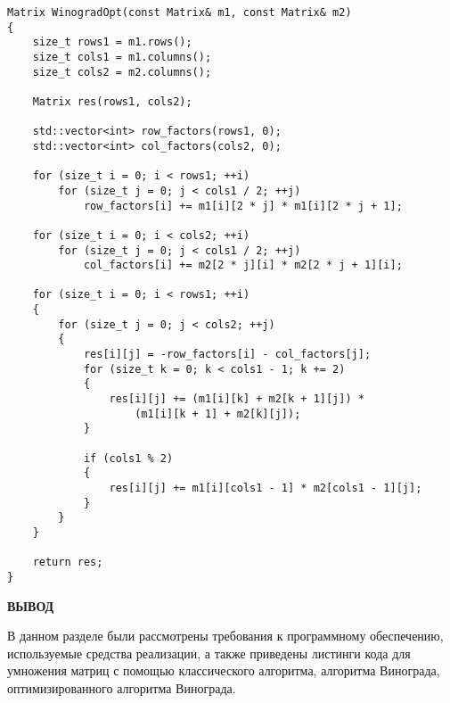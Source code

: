 \begin{center}
\captionsetup{justification=raggedright,singlelinecheck=off}
\begin{lstlisting}[label=lst:dam_lev_dyn,caption=Оптимизированный алгоритм Винограда]
Matrix WinogradOpt(const Matrix& m1, const Matrix& m2)
{
    size_t rows1 = m1.rows();
    size_t cols1 = m1.columns();
    size_t cols2 = m2.columns();

    Matrix res(rows1, cols2);

    std::vector<int> row_factors(rows1, 0);
    std::vector<int> col_factors(cols2, 0);

    for (size_t i = 0; i < rows1; ++i)
        for (size_t j = 0; j < cols1 / 2; ++j)
            row_factors[i] += m1[i][2 * j] * m1[i][2 * j + 1];

    for (size_t i = 0; i < cols2; ++i)
        for (size_t j = 0; j < cols1 / 2; ++j)
            col_factors[i] += m2[2 * j][i] * m2[2 * j + 1][i];

    for (size_t i = 0; i < rows1; ++i)
    {
        for (size_t j = 0; j < cols2; ++j)
        {
            res[i][j] = -row_factors[i] - col_factors[j];
            for (size_t k = 0; k < cols1 - 1; k += 2)
            {
                res[i][j] += (m1[i][k] + m2[k + 1][j]) *
                    (m1[i][k + 1] + m2[k][j]);
            }

            if (cols1 % 2)
            {
                res[i][j] += m1[i][cols1 - 1] * m2[cols1 - 1][j];
            }
        }
    }

    return res;
}
\end{lstlisting}
\end{center}

\vspace{5mm}

\textbf{ВЫВОД}

В данном разделе были рассмотрены требования к программному обеспечению, используемые средства реализации, а также приведены листинги кода для умножения матриц с помощью классического алгоритма, алгоритма Винограда, оптимизированного алгоритма Винограда.

\clearpage
